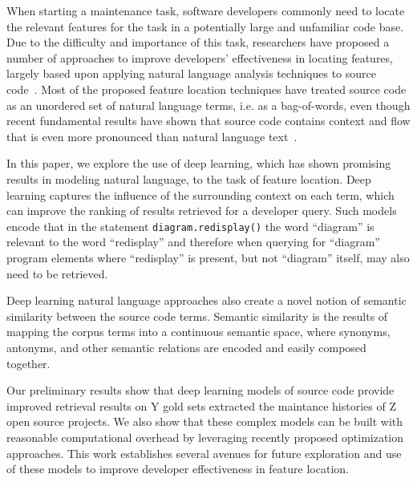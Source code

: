 
% 
%
When starting a maintenance task, software developers commonly need to
locate the relevant features for the task in a potentially large and
unfamiliar code base. Due to the difficulty and importance of this
task, researchers have proposed a number of approaches to improve
developers' effectiveness in locating features, largely based upon
applying natural language analysis techniques to source
code~\cite{dit_feature_2013}. Most of the proposed feature location
techniques have treated source code as an unordered set of natural
language terms, i.e. as a bag-of-words, even though recent fundamental
results have shown that source code contains context and flow that is
even more pronounced than natural language
text~\cite{hindle_naturalness_2012}.


%
%
In this paper, we explore the use of deep learning, which has shown
promising results in modeling natural language, to the task of feature
location. Deep learning captures the influence of the surrounding
context on each term, which can improve the ranking of results
retrieved for a developer query. Such models encode that in the
statement {\tt diagram.redisplay()} the word ``diagram'' is relevant
to the word ``redisplay'' and therefore when querying for ``diagram''
program elements where ``redisplay'' is present, but not ``diagram''
itself, may also need to be retrieved.

Deep learning natural language approaches also create a novel notion
of semantic similarity between the source code terms. Semantic
similarity is the results of mapping the corpus terms into a
continuous semantic space, where synonyms, antonyms, and other
semantic relations are encoded and easily composed together.



%
%

Our preliminary results show that deep learning models of source code
provide improved retrieval results on Y gold sets extracted the
maintance histories of Z open source projects. We also show that these
complex models can be built with reasonable computational overhead by
leveraging recently proposed optimization approaches. This work
establishes several avenues for future exploration and use of these
models to improve developer effectiveness in feature location.



